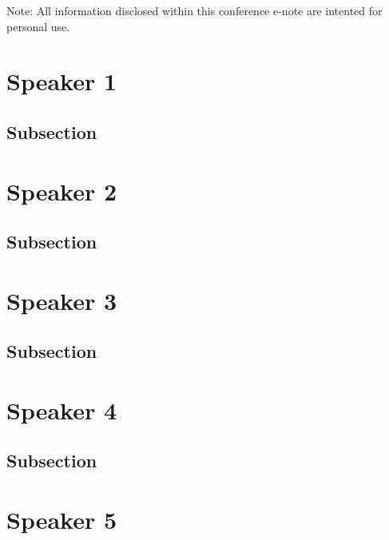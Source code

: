 \documentclass[
]{book}
\begin{document}
Note: All information disclosed within this conference e-note are intented for personal use.

\hypertarget{speaker-1}{%
\chapter*{Speaker 1}\label{speaker-1}}

\hypertarget{subsection}{%
\section{Subsection}\label{subsection}}

\hypertarget{speaker-2}{%
\chapter*{Speaker 2}\label{speaker-2}}

\hypertarget{subsection}{%
\section{Subsection}\label{subsection}}

\hypertarget{speaker-3}{%
\chapter*{Speaker 3}\label{speaker-3}}

\hypertarget{subsection}{%
\section{Subsection}\label{subsection}}

\hypertarget{speaker-4}{%
\chapter*{Speaker 4}\label{speaker-4}}

\hypertarget{subsection}{%
\section{Subsection}\label{subsection}}

\hypertarget{speaker-5}{%
\chapter*{Speaker 5}\label{speaker-5}}
\end{document}
